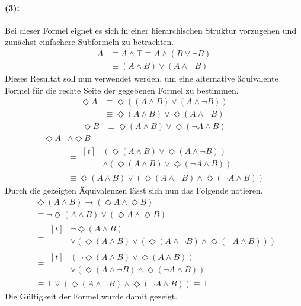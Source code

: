 \begin{multicols}{2}
      \paragraph{(3):}
      Bei dieser Formel eignet es sich in einer hierarchischen Struktur vorzugehen und zunächst einfachere Subformeln zu betrachten.
      \begin{align*}
        A &\equiv A \land \top \equiv A \land (B\lor\lnot B) \\
        &\equiv (A\land B) \lor (A\land\lnot B)
      \end{align*}
      Dieses Resultat soll nun verwendet werden, um eine alternative äquivalente Formel für die rechte Seite der gegebenen Formel zu bestimmen.
      \[\begin{aligned}
        \Diamond A &\equiv \Diamond((A\land B) \lor (A\land\lnot B)) \\
        &\equiv \Diamond(A\land B) \lor \Diamond(A\land\lnot B)
      \end{aligned}\]
      \[\begin{aligned}
        \Diamond B &\equiv \Diamond(A\land B) \lor \Diamond(\lnot A\land B)
      \end{aligned}\]
      \[\begin{aligned}
        \Diamond A &\land \Diamond B \\
        &\equiv
        \begin{aligned}[t]
          &(\Diamond(A\land B) \lor \Diamond(A\land\lnot B)) \\
          &\land (\Diamond(A\land B) \lor \Diamond(\lnot A\land B))
        \end{aligned} \\
        &\equiv \Diamond(A\land B) \lor (\Diamond(A\land\lnot B)\land\Diamond(\lnot A\land B))
      \end{aligned}\]
      Durch die gezeigten Äquivalenzen lässt sich nun das Folgende notieren.
      \begin{align*}
        &\Diamond(A\land B)\to(\Diamond A\land \Diamond B) \\
        &\equiv \lnot\Diamond(A\land B) \lor (\Diamond A\land\Diamond B) \\
        &\equiv
        \begin{aligned}[t]
          &\lnot\Diamond(A\land B) \\
          &\lor (\Diamond(A\land B) \lor (\Diamond(A\land\lnot B) \land\Diamond(\lnot A\land B)))
        \end{aligned} \\
        &\equiv
        \begin{aligned}[t]
          &(\lnot\Diamond(A\land B) \lor \Diamond(A\land B)) \\
          &\lor(\Diamond(A\land\lnot B) \land\Diamond(\lnot A\land B))
        \end{aligned} \\
        &\equiv \top \lor (\Diamond(A\land\lnot B) \land\Diamond(\lnot A\land B)) \equiv \top
      \end{align*}
      Die Gültigkeit der Formel wurde damit gezeigt. \qedbox


\end{multicols}
